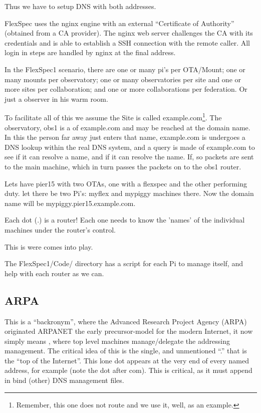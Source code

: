 Thus we have to setup DNS with both addresses.




FlexSpec uses the nginx engine with an external ``Certificate of Authority''
(obtained from a CA provider). The nginx web server challenges the CA with
its credentials and is able to establish a SSH connection with the remote
caller. All login in steps are handled by nginx at the final address.




In the FlexSpec1 scenario, there are one or many  pi's per OTA/Mount; one or many 
mounts per observatory; one or many observatories per site and one or more sites
per collaboration; and one or more collaborations per federation. Or just a observer
in his warm room.

To facilitate all of this we assume the Site is called
example.com\footnote{Remember, this one does not route and we use it,
  well, as an example.}. The observatory, obs1 is a  of
example.com and may be reached at the  domain
name. In this the person far away just enters that name, example.com
is undergoes a DNS lookup within the real DNS system, and a query is
made of example.com to see if it can resolve a name, and if it can
resolve the  name.  If, so packets are sent
to the main machine, which in turn passes the packets on to the
obs1 router.

Lets have pier15 with two OTAs, one with a flexspec and the other
performing  duty. let there be two Pi's:  myflex and mypiggy
machines there. Now the domain name will be
mypiggy.pier15.example.com.

Each dot (.) is a router! Each one needs to know the 'names' of the
individual machines under the router's control.

This is were  comes into play.

The FlexSpec1/Code/ directory has a script for each Pi to manage itself,
and help with each router as we can.

\subsection{ARPA}

This is a ``backronym'', where the Advanced Research Project Agency (ARPA)
originated ARPANET the early precursor-model for the modern Internet, it
now simply means , where top level
machines manage/delegate the addressing management. The critical idea
of this is the single, and unmentioned ``.'' that is the ``top of the Internet''.
This lone dot appears at the very end of every named address, for example
 (note the dot after com). This is critical, as it must
append in bind (other) DNS management files.

